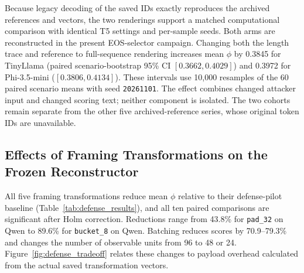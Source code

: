 \documentclass[electronics,article,submit,pdftex,moreauthors]{Definitions/mdpi}
\begin{document}
Because legacy decoding of the saved IDs exactly reproduces the archived references and vectors, the two renderings support a matched computational comparison with identical T5 settings and per-sample seeds. Both arms are reconstructed in the present EOS-selector campaign. Changing both the length trace and reference to full-sequence rendering increases mean $\phi$ by 0.3845 for TinyLlama (paired scenario-bootstrap 95\% CI $[0.3662,0.4029]$) and 0.3972 for Phi-3.5-mini ($[0.3806,0.4134]$). These intervals use 10,000 resamples of the 60 paired scenario means with seed \texttt{20261101}. The effect combines changed attacker input and changed scoring text; neither component is isolated. The two cohorts remain separate from the other five archived-reference series, whose original token IDs are unavailable.

\begin{table}[ht]
\centering
\caption{Separate cohorts with verified full-sequence references ($N=300$ per model; 512-token victim limit; all segments, three T5 samples per segment and 80-token T5 input and output limits). Mean-$\phi$ intervals use 10,000 resamples of 60 scenarios. These rows form a targeted reference-validation experiment and are analyzed separately from the seven archived-reference cohorts. EOS indicates end-of-sequence termination, not reconstruction correctness.}
\label{tab:fresh_results}
\end{table}

\subsection{Effects of Framing Transformations on the Frozen Reconstructor}\label{sec:defense}
All five framing transformations reduce mean $\phi$ relative to their defense-pilot baseline (Table~\ref{tab:defense_results}), and all ten paired comparisons are significant after Holm correction. Reductions range from 43.8\% for \texttt{pad\_32} on Qwen to 89.6\% for \texttt{bucket\_8} on Qwen. Batching reduces scores by 70.9--79.3\% and changes the number of observable units from 96 to 48 or 24. Figure~\ref{fig:defense_tradeoff} relates these changes to payload overhead calculated from the actual saved transformation vectors.
\end{document}
